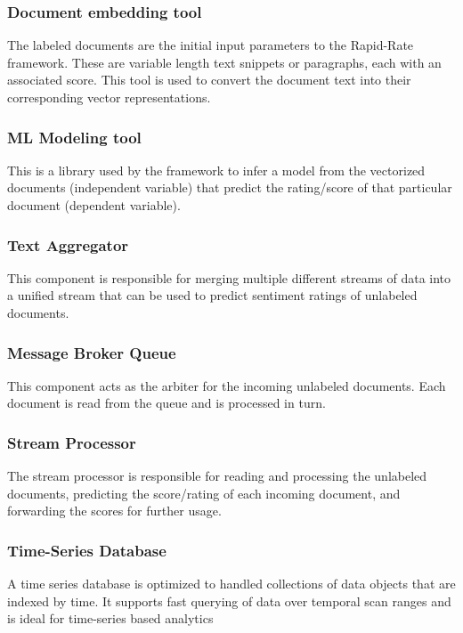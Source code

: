 \documentclass[conference]{IEEEtran}
\begin{document}
        \subsubsection{Document embedding tool}
            The labeled documents are the initial input parameters to the Rapid-Rate framework. These are variable length text snippets or paragraphs, each with an associated score. This tool is used to convert the document text into their corresponding vector representations.

        \subsubsection{ML Modeling tool}
            This is a library used by the framework to infer a model from the vectorized documents (independent variable) that predict the rating/score of that particular document (dependent variable). 

        \subsubsection{Text Aggregator}
            This component is responsible for merging multiple different streams of data into a unified stream that can be used to predict sentiment ratings of unlabeled documents.

        \subsubsection{Message Broker Queue}
            This component acts as the arbiter for the incoming unlabeled documents. 
            Each document is read from the queue and is processed in turn.

        \subsubsection{Stream Processor}
            The stream processor is responsible for reading and processing the unlabeled documents, predicting the score/rating of each incoming document, and forwarding the scores for further usage.

        \subsubsection{Time-Series Database}
            A time series database is optimized to handled collections of data objects that are indexed by time. 
            It supports fast querying of data over temporal scan ranges and is ideal for time-series based analytics
\end{document}

